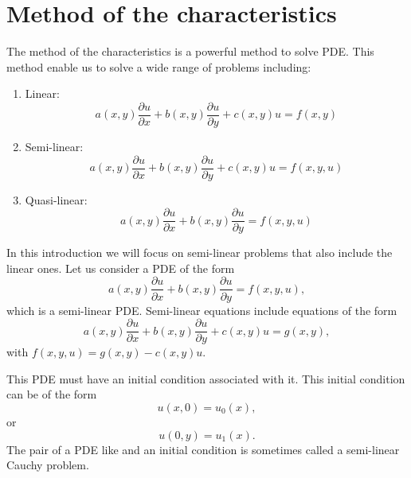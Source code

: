 \section{Method of the characteristics}


The method of the characteristics is a powerful method to solve PDE. This method enable us to solve a wide range of problems including:
\begin{enumerate}
  \item Linear:
  \begin{equation}
  a(x, y) \frac{\partial u}{\partial x}
  + b(x, y) \frac{\partial u}{\partial y}
  + c(x, y) u
  = f(x, y)
  \end{equation}
  \item Semi-linear:
  \begin{equation}
  a(x, y) \frac{\partial u}{\partial x}
  + b(x, y) \frac{\partial u}{\partial y}
  + c(x, y) u
  = f(x, y, u)
  \end{equation}
  \item  Quasi-linear:
  \begin{equation}
  a(x, y) \frac{\partial u}{\partial x}
  + b(x, y) \frac{\partial u}{\partial y}
  = f(x, y, u)
  \end{equation}
\end{enumerate}

In this introduction  we will focus on semi-linear problems that also include
the linear ones. Let us consider a PDE of the form
\begin{equation}
  a(x, y) \frac{\partial u}{\partial x}
  + b(x, y) \frac{\partial u}{\partial y}
  = f(x, y, u),
  \label{eq_semi_linear}
\end{equation}
which is a semi-linear PDE. Semi-linear equations include equations of the form
\begin{equation}
  a(x, y) \frac{\partial u}{\partial x}
  + b(x, y) \frac{\partial u}{\partial y}
  + c(x, y) u
  = g(x, y),
\end{equation}
with $f(x, y, u) = g(x, y) - c(x, y) u$.

This PDE must have an initial condition associated with it. This initial
condition can be of the form
\begin{equation}
  u(x, 0) = u_0(x),
\end{equation}
or
\begin{equation}
  u(0, y) = u_1(x).
\end{equation}
The pair of a PDE like  and an initial condition is
sometimes called a semi-linear Cauchy problem.

